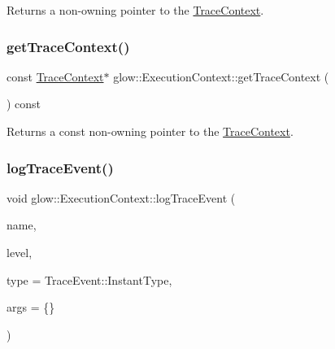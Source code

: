 \begin{DoxyReturn}{Returns}
a non-\/owning pointer to the \hyperlink{classglow_1_1_trace_context}{Trace\+Context}. 
\end{DoxyReturn}
\mbox{\label{classglow_1_1_execution_context_a2a7b10635c0b5d13f7234b3edc1ea30d}} 
\subsubsection{\texorpdfstring{get\+Trace\+Context()}{getTraceContext()}\hspace{0.1cm}{\footnotesize\ttfamily [2/2]}}
{\footnotesize\ttfamily const \hyperlink{classglow_1_1_trace_context}{Trace\+Context}$\ast$ glow\+::\+Execution\+Context\+::get\+Trace\+Context (\begin{DoxyParamCaption}{ }\end{DoxyParamCaption}) const\hspace{0.3cm}{\ttfamily [inline]}}

\begin{DoxyReturn}{Returns}
a const non-\/owning pointer to the \hyperlink{classglow_1_1_trace_context}{Trace\+Context}. 
\end{DoxyReturn}
\mbox{\label{classglow_1_1_execution_context_a47595ddf5237caa5b6bb901bba1733fe}} 
\subsubsection{\texorpdfstring{log\+Trace\+Event()}{logTraceEvent()}}
{\footnotesize\ttfamily void glow\+::\+Execution\+Context\+::log\+Trace\+Event (\begin{DoxyParamCaption}\item[{llvm\+::\+String\+Ref}]{name,  }\item[{\hyperlink{structglow_1_1_trace_event_a10132a384d74408a112510cbe1b7d978}{Trace\+Level}}]{level,  }\item[{char}]{type = {\ttfamily TraceEvent\+:\+:InstantType},  }\item[{std\+::map$<$ std\+::string, std\+::string $>$}]{args = {\ttfamily \{\}} }\end{DoxyParamCaption})\hspace{0.3cm}{\ttfamily [inline]}}

